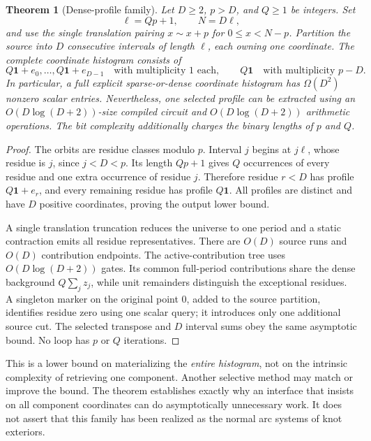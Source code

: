 \documentclass[11pt]{article}
\newtheorem{theorem}{Theorem}[section]
\theoremstyle{definition}\newtheorem{definition}[theorem]{Definition}
\theoremstyle{remark}\newtheorem{remark}[theorem]{Remark}
\newcommand{\one}{\mathbf 1}
\begin{document}
\begin{theorem}[Dense-profile family]
\label{thm:family}
Let $D\ge2$, $p>D$, and $Q\ge1$ be integers. Set
\[
 \ell=Qp+1,\qquad N=D\ell,
\]
and use the single translation pairing $x\sim x+p$ for $0\le x<N-p$.
Partition the source into $D$ consecutive intervals of length $\ell$, each owning
one coordinate. The complete coordinate histogram consists of
\begin{equation}
 Q\one+e_0,\ldots,Q\one+e_{D-1}
 \quad\text{with multiplicity }1\text{ each},\qquad
 Q\one\quad\text{with multiplicity }p-D.
 \label{eq:densefamily}
\end{equation}
In particular, a full explicit sparse-or-dense coordinate histogram has
$\Omega(D^2)$ nonzero scalar entries. Nevertheless, one selected profile can be
extracted using an $O(D\log(D+2))$-size compiled circuit and $O(D\log(D+2))$
arithmetic operations. The bit complexity additionally charges the binary
lengths of $p$ and $Q$.
\end{theorem}
\begin{proof}
The orbits are residue classes modulo $p$. Interval $j$ begins at $j\ell$, whose
residue is $j$, since $j<D<p$. Its length $Qp+1$ gives $Q$ occurrences of every
residue and one extra occurrence of residue $j$. Therefore residue $r<D$ has
profile $Q\one+e_r$, and every remaining residue has profile $Q\one$. All profiles
are distinct and have $D$ positive coordinates, proving the output lower bound.

A single translation truncation reduces the universe to one period and a static
contraction emits all residue representatives. There are $O(D)$ source runs and
$O(D)$ contribution endpoints. The active-contribution tree uses
$O(D\log(D+2))$ gates. Its common full-period contributions share the dense
background $Q\sum_j z_j$, while unit remainders distinguish the exceptional
residues. A singleton marker on the original point $0$, added to the source
partition, identifies residue zero using one scalar query; it introduces only
one additional source cut. The selected transpose and $D$ interval sums obey the
same asymptotic bound. No loop has $p$ or $Q$ iterations.
\end{proof}

This is a lower bound on materializing the \emph{entire histogram}, not on the
intrinsic complexity of retrieving one component. Another selective method may
match or improve the bound. The theorem establishes exactly why an interface
that insists on all component coordinates can do asymptotically unnecessary
work. It does not assert that this family has been realized as the normal arc
systems of knot exteriors.
\end{document}
